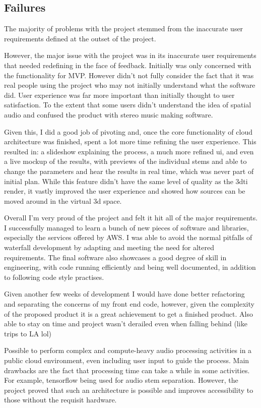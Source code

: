 \subsection{Failures}\label{subsec:failures}

The majority of problems with the project stemmed from the inaccurate user requirements
defined at the outset of the project.

However,
the major issue with the project was in its inaccurate user requirements that needed redefining in the face of feedback.
Initially was only concerned with the functionality for MVP.
However didn't not fully consider the fact
that it was real people using the project who may not initially understand what the software did.
User experience was far more important than initially thought to user satisfaction.
To the extent that some users didn't understand the idea of spatial audio
and confused the product with stereo music making software.

Given this, I did a good job of pivoting and, once the core functionality of cloud architecture was finished,
spent a lot more time refining the user experience.
This resulted in: a slideshow explaining the process, a much more refined ui, and even a live mockup of the results,
with previews of the individual stems and able to change the parameters and hear the results in real time,
which was never part of initial plan.
While this feature didn't have the same level of quality as the 3dti render,
it vastly improved the user experience and showed how sources can be moved around in the virtual 3d space.

Overall I'm very proud of the project and felt it hit all of the major requirements.
I successfully managed to learn a bunch of new pieces of software and libraries, especially the services offered by AWS.
I was able
to avoid the normal pitfalls of waterfall development by adapting and meeting the need for altered requirements.
The final software also showcases a good degree of skill in engineering,
with code running efficiently and being well documented, in addition to following code style practises.

Given another few weeks of development I would have done better
refactoring and separating the concerns of my front end code,
however, given the complexity of the proposed product it is a great achievement to get a finished product.
Also able to stay on time and project wasn't derailed even when falling behind (like trips to LA lol)

Possible to perform complex and compute-heavy audio processing activities in a public cloud environment,
even including user input to guide the process.
Main drawbacks are the fact that processing time can take a while in some activities.
For example, tensorflow being used for audio stem separation.
However,
the project proved that such an architecture is possible
and improves accessibility to those without the requisit hardware.

